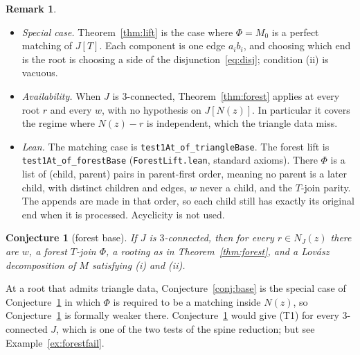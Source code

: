 \documentclass[11pt]{amsart}
\newtheorem{conjecture}[theorem]{Conjecture}
\theoremstyle{definition}
\newtheorem{remark}[theorem]{Remark}
\begin{document}
\begin{remark}
\begin{itemize}[leftmargin=*]
\item \emph{Special case.} Theorem~\ref{thm:lift} is the case where $\Phi=M_0$ is a perfect matching
of $J[T]$. Each component is one edge $a_ib_i$, and choosing which end is the root is choosing a side
of the disjunction~\eqref{eq:disj}; condition (ii) is vacuous.
\item \emph{Availability.} When $J$ is $3$-connected, Theorem~\ref{thm:forest} applies at every root
$r$ and every $w$, with no hypothesis on $J[N(z)]$. In particular it covers the regime where
$N(z)-r$ is independent, which the triangle data miss.
\item \emph{Lean.} The matching case is \texttt{test1At\_of\_triangleBase}. The forest lift is
\texttt{test1At\_of\_forestBase} (\texttt{ForestLift.lean}, standard axioms). There $\Phi$ is a list of
(child, parent) pairs in parent-first order, meaning no parent is a later child, with distinct
children and edges, $w$ never a child, and the $T$-join parity. The appends are made in that order,
so each child still has exactly its original end when it is processed. Acyclicity is not used.
\end{itemize}
\end{remark}

\begin{conjecture}[forest base]\label{conj:forest}
If $J$ is $3$-connected, then for every $r\in N_J(z)$ there are $w$, a forest $T$-join $\Phi$, a
rooting as in Theorem~\ref{thm:forest}, and a Lov\'asz decomposition of $M$ satisfying (i) and (ii).
\end{conjecture}

At a root that admits triangle data, Conjecture~\ref{conj:base} is the special case of
Conjecture~\ref{conj:forest} in which $\Phi$ is required to be a matching inside $N(z)$, so
Conjecture~\ref{conj:forest} is formally weaker there. Conjecture~\ref{conj:forest} would give (T1) for
every $3$-connected $J$, which is one of the two tests of the spine reduction; but see
Example~\ref{ex:forestfail}.
\end{document}
